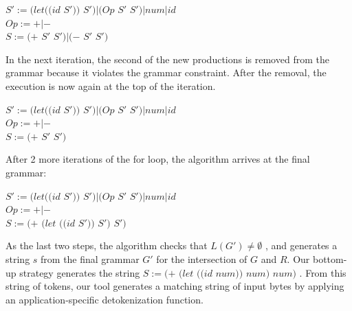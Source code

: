\begin{center}

$S' :=  (let ((id$ $S'))$ $S') | (Op$ $S'$ $S') | num | id$ \\
$Op := + | −$ \\
$S := (+$ $S'$ $S') | (-$ $S'$ $S')$ \\

\end{center}

In the next iteration, the second of the new productions is removed from the grammar because it violates the grammar constraint. After the removal, the execution is now again at the top of the iteration.

\begin{center}

$S' :=  (let ((id$ $S'))$ $S') | (Op$ $S'$ $S') | num | id$ \\
$Op := + | −$ \\
$S := (+$ $S'$ $S') $ \\

\end{center}

After 2 more iterations of the for loop, the algorithm arrives at the final grammar:

\begin{center}

$S' :=  (let ((id$ $S'))$ $S') | (Op$ $S'$ $S') | num | id$ \\
$Op := + | −$ \\
$S := (+$ $(let$ $((id$ $S'))$ $S')$ $S')$ \\

\end{center}

As the last two steps, the algorithm checks that $L(G') \neq \emptyset$ , and generates a string $s$ from the final grammar $G'$ for the intersection of $G$ and $R$. Our bottom-up strategy generates the string $S := (+$ $(let$ $((id$ $num))$ $num)$ $num)$ . From this string of tokens, our tool generates a matching string of input bytes by applying an application-specific detokenization function.